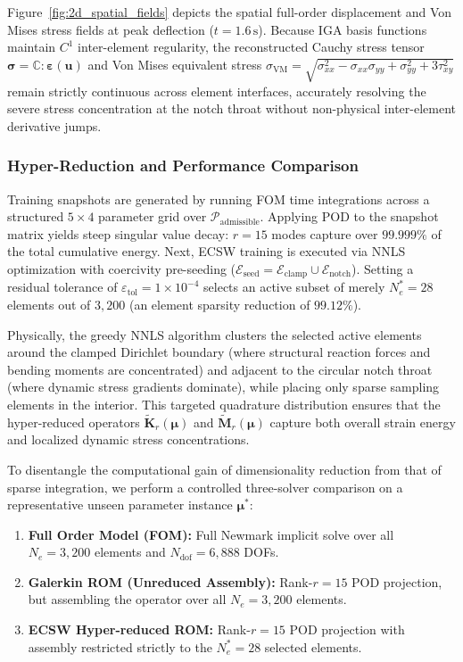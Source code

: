 Figure~\ref{fig:2d_spatial_fields} depicts the spatial full-order displacement and Von Mises stress fields at peak deflection ($t = 1.6\,\text{s}$). Because IGA basis functions maintain $C^1$ inter-element regularity, the reconstructed Cauchy stress tensor $\bm{\sigma} = \mathbb{C} : \bm{\varepsilon}(\bm{u})$ and Von Mises equivalent stress $\sigma_{\text{VM}} = \sqrt{\sigma_{xx}^2 - \sigma_{xx}\sigma_{yy} + \sigma_{yy}^2 + 3\tau_{xy}^2}$ remain strictly continuous across element interfaces, accurately resolving the severe stress concentration at the notch throat without non-physical inter-element derivative jumps.

\subsubsection{Hyper-Reduction and Performance Comparison}
Training snapshots are generated by running FOM time integrations across a structured $5 \times 4$ parameter grid over $\mathcal{P}_{\text{admissible}}$. Applying POD to the snapshot matrix yields steep singular value decay: $r = 15$ modes capture over $99.999\%$ of the total cumulative energy. Next, ECSW training is executed via NNLS optimization with coercivity pre-seeding ($\mathcal{E}_{\text{seed}} = \mathcal{E}_{\text{clamp}} \cup \mathcal{E}_{\text{notch}}$). Setting a residual tolerance of $\varepsilon_{\text{tol}} = 1 \times 10^{-4}$ selects an active subset of merely $N_e^* = 28$ elements out of $3,200$ (an element sparsity reduction of $99.12\%$).

Physically, the greedy NNLS algorithm clusters the selected active elements around the clamped Dirichlet boundary (where structural reaction forces and bending moments are concentrated) and adjacent to the circular notch throat (where dynamic stress gradients dominate), while placing only sparse sampling elements in the interior. This targeted quadrature distribution ensures that the hyper-reduced operators $\tilde{\bm{K}}_r(\bm{\mu})$ and $\tilde{\bm{M}}_r(\bm{\mu})$ capture both overall strain energy and localized dynamic stress concentrations.

To disentangle the computational gain of dimensionality reduction from that of sparse integration, we perform a controlled three-solver comparison on a representative unseen parameter instance $\bm{\mu}^*$:
\begin{enumerate}
    \item \textbf{Full Order Model (FOM):} Full Newmark implicit solve over all $N_e = 3,200$ elements and $N_{\text{dof}} = 6,888$ DOFs.
    \item \textbf{Galerkin ROM (Unreduced Assembly):} Rank-$r = 15$ POD projection, but assembling the operator over all $N_e = 3,200$ elements.
    \item \textbf{ECSW Hyper-reduced ROM:} Rank-$r = 15$ POD projection with assembly restricted strictly to the $N_e^* = 28$ selected elements.
\end{enumerate}

